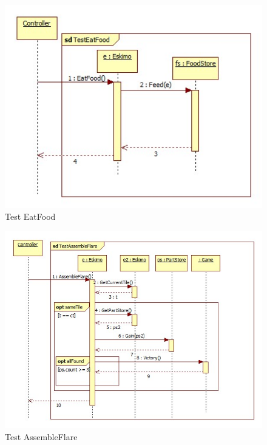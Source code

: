 \begin{figure}[H]
	\begin{center}
		\includegraphics[width=12cm]{chapters/chapter05/diagrams/Test_EatFood.jpg}
		\caption{Test EatFood}
		\label{fig:Test EatFood}
	\end{center}
\end{figure}
\begin{figure}[H]
	\begin{center}
		\includegraphics[width=17cm]{chapters/chapter05/diagrams/Test_AssembleFlare.jpg}
		\caption{Test AssembleFlare}
		\label{fig:Test AssembleFlare}
	\end{center}
\end{figure}

